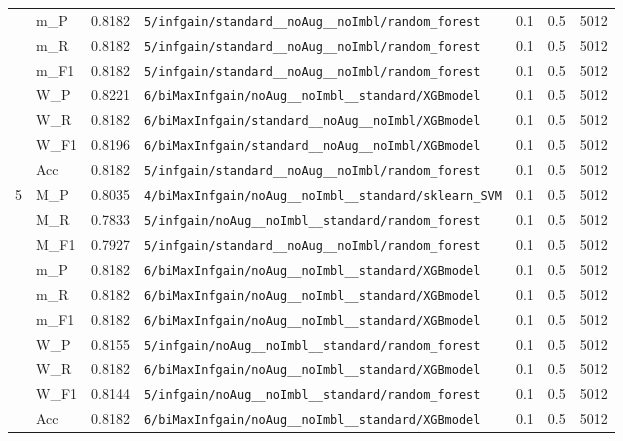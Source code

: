 \begin{table}[htbp]
\begin{tabular}{|c|l|c|>{\ttfamily\footnotesize}p{7.2cm}|c|c|c|}
 & m\_P & 0.8182 & \texttt{5/infgain/standard\_\_noAug\_\_noImbl/random\_forest} & 0.1 & 0.5  & 5012 \\ 
 & m\_R & 0.8182 & \texttt{5/infgain/standard\_\_noAug\_\_noImbl/random\_forest} & 0.1 & 0.5  & 5012 \\ 
 & m\_F1 & 0.8182 & \texttt{5/infgain/standard\_\_noAug\_\_noImbl/random\_forest} & 0.1 & 0.5  & 5012 \\ 
 & W\_P & 0.8221 & \texttt{6/biMaxInfgain/noAug\_\_noImbl\_\_standard/XGBmodel} & 0.1 & 0.5  & 5012 \\ 
 & W\_R & 0.8182 & \texttt{6/biMaxInfgain/standard\_\_noAug\_\_noImbl/XGBmodel} & 0.1 & 0.5  & 5012 \\ 
 & W\_F1 & 0.8196 & \texttt{6/biMaxInfgain/standard\_\_noAug\_\_noImbl/XGBmodel} & 0.1 & 0.5  & 5012 \\ 
 & Acc & 0.8182 & \texttt{5/infgain/standard\_\_noAug\_\_noImbl/random\_forest} & 0.1 & 0.5  & 5012 \\ 
\hline
\multirow{10}{*}{5} & M\_P & 0.8035 & \texttt{4/biMaxInfgain/noAug\_\_noImbl\_\_standard/sklearn\_SVM} & 0.1 & 0.5  & 5012 \\ 
 & M\_R & 0.7833 & \texttt{5/infgain/noAug\_\_noImbl\_\_standard/random\_forest} & 0.1 & 0.5  & 5012 \\ 
 & M\_F1 & 0.7927 & \texttt{5/infgain/standard\_\_noAug\_\_noImbl/random\_forest} & 0.1 & 0.5  & 5012 \\ 
 & m\_P & 0.8182 & \texttt{6/biMaxInfgain/noAug\_\_noImbl\_\_standard/XGBmodel} & 0.1 & 0.5  & 5012 \\ 
 & m\_R & 0.8182 & \texttt{6/biMaxInfgain/noAug\_\_noImbl\_\_standard/XGBmodel} & 0.1 & 0.5  & 5012 \\ 
 & m\_F1 & 0.8182 & \texttt{6/biMaxInfgain/noAug\_\_noImbl\_\_standard/XGBmodel} & 0.1 & 0.5  & 5012 \\ 
 & W\_P & 0.8155 & \texttt{5/infgain/noAug\_\_noImbl\_\_standard/random\_forest} & 0.1 & 0.5  & 5012 \\ 
 & W\_R & 0.8182 & \texttt{6/biMaxInfgain/noAug\_\_noImbl\_\_standard/XGBmodel} & 0.1 & 0.5  & 5012 \\ 
 & W\_F1 & 0.8144 & \texttt{5/infgain/noAug\_\_noImbl\_\_standard/random\_forest} & 0.1 & 0.5  & 5012 \\ 
 & Acc & 0.8182 & \texttt{6/biMaxInfgain/noAug\_\_noImbl\_\_standard/XGBmodel} & 0.1 & 0.5  & 5012 \\ 
\hline
\end{tabular}
\end{table}